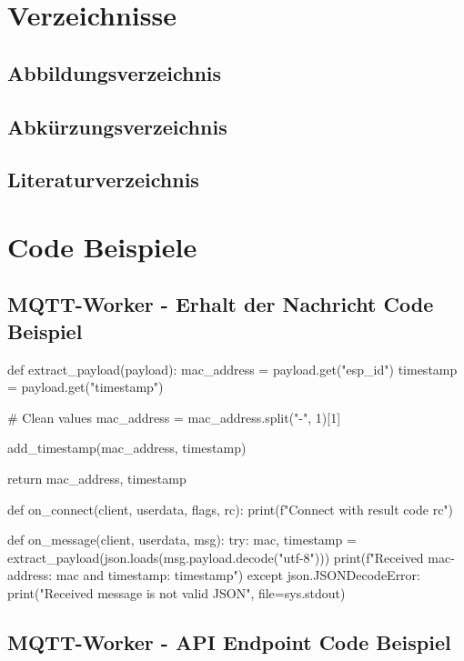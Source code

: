 \section{Verzeichnisse}
\subsection{Abbildungsverzeichnis}
{%
\makeatletter
{}
\makeatother
}

\newpage
\subsection{Abkürzungsverzeichnis}
{%
\renewcommand*{\glossarysection}[2][]{}
\printnoidxglossary[type=\acronymtype, sort=letter]
}
\newpage
\subsection{Literaturverzeichnis}
\printbibliography[heading=none]

\newpage
\section{Code Beispiele}
\subsection{MQTT-Worker - Erhalt der Nachricht Code Beispiel}

\begin{CodeBox}
def extract_payload(payload):
    mac_address = payload.get("esp_id")
    timestamp = payload.get("timestamp")

    # Clean values
    mac_address = mac_address.split("-", 1)[1]

    add_timestamp(mac_address, timestamp)

    return mac_address, timestamp

def on_connect(client, userdata, flags, rc):
    print(f"Connect with result code {rc}")

def on_message(client, userdata, msg):
    try:
        mac, timestamp = extract_payload(json.loads(msg.payload.decode("utf-8")))
        print(f"Received mac-address: {mac} and timestamp: {timestamp}")
    except json.JSONDecodeError:
        print("Received message is not valid JSON", file=sys.stdout)
\end{CodeBox}

\newpage

\subsection{MQTT-Worker - API Endpoint Code Beispiel}

